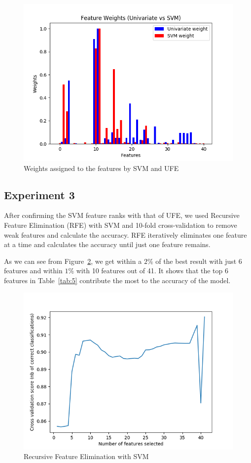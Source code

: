 \begin{figure}[htb]
	\centering
	\includegraphics[width=1\textwidth]{images/ufe_svm.png}
	\caption{Weights assigned to the features by SVM and UFE} 
	\label{fig:result_ufe_svm}
\end{figure}

\subsection{Experiment 3}

After confirming the SVM feature ranks with that of UFE, we used Recursive Feature Elimination (RFE) with SVM and 10-fold cross-validation to remove weak features and calculate the accuracy. RFE iteratively eliminates one feature at a time and calculates the accuracy until just one feature remains.

As we can see from Figure~\ref{fig:result_rfe}, we get within a $2$\% of the best result with just 6 features and within $1$\% with 10 features out of 41. It shows that the top 6 features in Table~\ref{tab:5} contribute the most to the accuracy of the model.

\begin{figure}[htb]
	\centering
	\includegraphics[width=1\textwidth]{images/rfe_svm.png}
	\caption{Recursive Feature Elimination with SVM} 
	\label{fig:result_rfe}
\end{figure}


